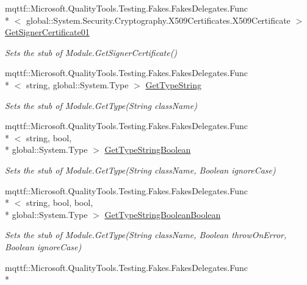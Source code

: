 \begin{DoxyCompactItemize}
mqttf\-::\-Microsoft.\-Quality\-Tools.\-Testing.\-Fakes.\-Fakes\-Delegates.\-Func\\*
$<$ global\-::\-System.\-Security.\-Cryptography.\-X509\-Certificates.\-X509\-Certificate $>$ \hyperlink{class_system_1_1_reflection_1_1_fakes_1_1_stub_module_a28fc6a2cd83888e2f6961231ee742fcc}{Get\-Signer\-Certificate01}
\begin{DoxyCompactList}\small\item\em Sets the stub of Module.\-Get\-Signer\-Certificate()\end{DoxyCompactList}\item 
mqttf\-::\-Microsoft.\-Quality\-Tools.\-Testing.\-Fakes.\-Fakes\-Delegates.\-Func\\*
$<$ string, global\-::\-System.\-Type $>$ \hyperlink{class_system_1_1_reflection_1_1_fakes_1_1_stub_module_afa0404650f305a17b8b56e38626b7dbc}{Get\-Type\-String}
\begin{DoxyCompactList}\small\item\em Sets the stub of Module.\-Get\-Type(\-String class\-Name)\end{DoxyCompactList}\item 
mqttf\-::\-Microsoft.\-Quality\-Tools.\-Testing.\-Fakes.\-Fakes\-Delegates.\-Func\\*
$<$ string, bool, \\*
global\-::\-System.\-Type $>$ \hyperlink{class_system_1_1_reflection_1_1_fakes_1_1_stub_module_a9fbb4fc421f7ea782fc931ed46448033}{Get\-Type\-String\-Boolean}
\begin{DoxyCompactList}\small\item\em Sets the stub of Module.\-Get\-Type(\-String class\-Name, Boolean ignore\-Case)\end{DoxyCompactList}\item 
mqttf\-::\-Microsoft.\-Quality\-Tools.\-Testing.\-Fakes.\-Fakes\-Delegates.\-Func\\*
$<$ string, bool, bool, \\*
global\-::\-System.\-Type $>$ \hyperlink{class_system_1_1_reflection_1_1_fakes_1_1_stub_module_a2a58e957699d71fb6b3cfbb0033ed96a}{Get\-Type\-String\-Boolean\-Boolean}
\begin{DoxyCompactList}\small\item\em Sets the stub of Module.\-Get\-Type(\-String class\-Name, Boolean throw\-On\-Error, Boolean ignore\-Case)\end{DoxyCompactList}\item 
mqttf\-::\-Microsoft.\-Quality\-Tools.\-Testing.\-Fakes.\-Fakes\-Delegates.\-Func\\*

\end{DoxyCompactItemize}
